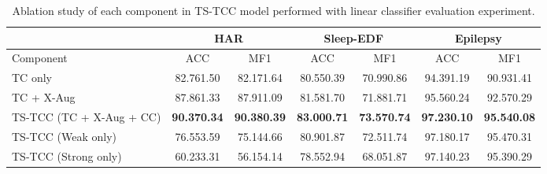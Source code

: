 \documentclass{article}
\begin{document}
\begin{table*}[!h]
\centering
\caption{Cross-domains transfer learning experiment applied on Fault Diagnosis dataset in terms of accuracy. (FT stands for fine-tuning)}
\label{tbl:TL}
\end{table*}
 
\begin{table*}[!htb]
\centering

\begin{tabular}{@{}l|cc|cc|cc@{}}
\toprule
 & \multicolumn{2}{c|}{HAR} & \multicolumn{2}{c|}{Sleep-EDF} & \multicolumn{2}{c}{Epilepsy} \\ \midrule
Component & ACC & MF1 & ACC & MF1 & ACC & MF1 \\ \midrule

TC only  & 82.761.50 & 82.171.64 & 80.550.39 & 70.990.86 & 94.391.19 & 90.931.41 \\

TC + X-Aug & 87.861.33 & 87.911.09 & 81.581.70 & 71.881.71 & 95.560.24 & 92.570.29 \\ 

TS-TCC (TC + X-Aug + CC)  & \textbf{90.370.34} & \textbf{90.380.39} & \textbf{83.000.71} & \textbf{73.570.74} & \textbf{97.230.10} & \textbf{95.540.08} \\

\midrule

TS-TCC (Weak only)   & 76.553.59 & 75.144.66 & 80.901.87 & 72.511.74 & 97.180.17 & 95.470.31 \\ 

TS-TCC (Strong only)  & 60.233.31 & 56.154.14 & 78.552.94 & 68.051.87 & 97.140.23 & 95.390.29 \\ 


\bottomrule
\end{tabular}
\caption{Ablation study of each component in TS-TCC model performed with linear classifier evaluation experiment.}
\label{tbl:ablation}
\end{table*}
\end{document}
